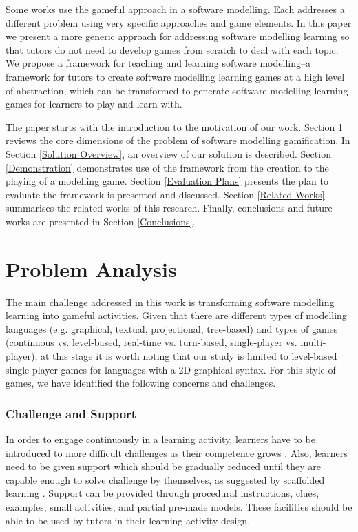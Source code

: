 \documentclass[conference]{IEEEtran}
\begin{document}
Some works \cite{Groenewegen2010, Stikkolorum2014, Richardsen2014, Ionita2015,  de2015gamification} use the gameful approach in a software modelling. Each addresses a different problem using very specific approaches and game elements. In this paper we present a more generic approach for addressing software modelling learning so that tutors do not need to develop games from scratch to deal with each topic. We propose a framework for teaching and learning software modelling--a framework for tutors to create software modelling learning games at a high level of abstraction, which can be transformed to generate software modelling learning games for learners to play and learn with.

The paper starts with the introduction to the motivation of our work. Section \ref{Problem Analysis} reviews the core dimensions of the problem of software modelling gamification. In Section \ref{Solution Overview}, an overview of our solution is described. Section \ref{Demonstration} demonstrates use of the framework from the creation to the playing of a modelling game. Section \ref{Evaluation Plans} presents the plan to evaluate the framework is presented and discussed. Section \ref{Related Works} summarises the related works of this research. Finally, conclusions and future works are presented in Section \ref{Conclusions}.

\section{Problem Analysis}
\label{Problem Analysis}
The main challenge addressed in this work is transforming software modelling learning into gameful activities. Given that there are different types of modelling languages (e.g. graphical, textual, projectional, tree-based) and types of games (continuous vs. level-based, real-time vs. turn-based, single-player vs. multi-player), at this stage it is worth noting that our study is limited to level-based single-player games for languages with a 2D graphical syntax. For this style of games, we have identified the following concerns and challenges.

\subsubsection{Challenge and Support}
\label{Challenge and Support}
In order to engage continuously in a learning activity, learners have to be introduced to more difficult challenges as their competence grows \cite{csikszentmihalyi2014toward}. Also, learners need to be given support which should be gradually reduced until they are capable enough to solve challenge by themselves, as suggested by scaffolded learning \cite{wood1976role, vygotsky1978mind}. Support can be provided through procedural instructions, clues, examples, small activities, and partial pre-made models. These facilities should be able to be used by tutors in their learning activity design. 
\end{document}
